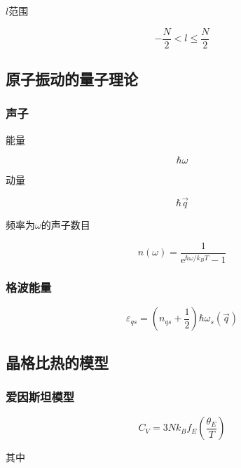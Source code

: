 \documentclass{article}
\newcommand*{\me}{\mathrm{e}}
\begin{document}
\begin{multicols}{2}
$l$范围

\begin{equation*}
  - \frac{N}{2} < l \leq \frac{N}{2}
\end{equation*}

\subsection{原子振动的量子理论}

\subsubsection{声子}

能量

\begin{equation*}
  \hbar \omega
\end{equation*}

动量

\begin{equation*}
  \hbar \vec{q}
\end{equation*}

频率为$\omega$的声子数目

\begin{equation*}
  n \left( \omega \right) = \frac{1}{\me^{\hbar \omega / k_B T} - 1}
\end{equation*}

\subsubsection{格波能量}

\begin{equation*}
  \varepsilon_{qs} = \left( n_{qs} + \frac{1}{2} \right) \hbar \omega_s \left( \vec{q} \right)
\end{equation*}

\subsection{晶格比热的模型}

\subsubsection{爱因斯坦模型}

\begin{equation*}
  C_V = 3Nk_B f_E \left( \frac{\theta_E}{T} \right)
\end{equation*}

其中


\end{multicols}
\end{document}
